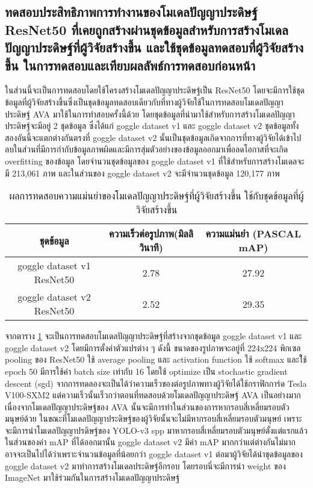 \subsection{ทดสอบประสิทธิภาพการทำงานของโมเดลปัญญาประดิษฐ์ ResNet50 ที่เคยถูกสร้างผ่านชุดข้อมูลสำหรับการสร้างโมเดลปัญญาประดิษฐ์ที่ผู้วิจัยสร้างขึ้น และใช้ชุดข้อมูลทดสอบที่ผู้วิจัยสร้างขึ้น ในการทดสอบและเทียบผลลัพธ์การทดสอบก่อนหน้า}
ในส่วนนี้จะเป็นการทดสอบโดยใช้โครงสร้างโมเดลปัญญาประดิษฐ์เป็น ResNet50 โดยจะมีการใช้ชุดข้อมูลที่ผู้วิจัยสร้างขึ้นซึ่งเป็นชุดข้อมูลทดสอบเดียวกับที่ทางผู้วิจัยใช้ในการทดสอบโมเดลปัญญาประดิษฐ์ AVA มาใช้ในการทำสอบครั้งนี้ด้วย โดยชุดข้อมูลที่นำมาใช้สำหรับการสร้างโมเดลปัญญาประดิษฐ์จะมีอยู่ 2 ชุดข้อมูล ซึ่งได้แก่ goggle dataset v1 และ goggle dataset v2 ชุดข้อมูลทั้งสองอันนี้จะแตกต่างกันตรงที่ goggle dataset v2 นั้นเป็นชุดข้อมูลเกิดจากการที่ทางผู้วิจัยได้เข้าไปลบในส่วนที่มีการกำกับข้อมูลภาพผิดและมีการสุ่มตัวอย่างของข้อมูลออกมาเพื่อลดโอกาสที่จะเกิด overfitting ของข้อมูล โดยจำนวนชุดข้อมูลของ goggle dataset v1 ที่ใช้สำหรับการสร้างโมเดลจะมี 213,061 ภาพ และในส่วนของ goggle dataset v2 จะมีจำนวนชุดข้อมูล 120,177 ภาพ
\clearpage
\begin{table}[!ht]
	\centering
	\begin{tabular}{|c|c|c|}
			\hline
			{ชุดข้อมูล}&{ความเร็วต่อรูปภาพ(มิลลิวินาที)}&{ความแม่นยำ (PASCAL mAP)}			\\
			\hline
			goggle dataset v1 ResNet50			& 2.78			& 27.92				\\
			goggle dataset v2 ResNet50			& 2.52			& 29.35				\\
			\hline
	\end{tabular}
\caption{ผลการทดสอบความแม่นยำของโมเดลปัญญาประดิษฐ์ที่ผู้วิจัยสร้างขึ้น ใช้กับชุดข้อมูลที่ผู้วิจัยสร้างขึ้น}
\label{tab: Test PASCAL mAP of dataset created by the researcher}
\end{table}
จากตาราง \ref{tab: Test PASCAL mAP of dataset created by the researcher} จะเป็นการทดสอบโมเดลปัญญาประดิษฐ์ที่สร้างจากชุดข้อมูล goggle dataset v1 และ goggle dataset v2 โดยมีการตั้งค่าตัวแปรต่าง ๆ ดังนี้ ขนาดของรูปภาพจะอยู่ที่ 224x224 พิกเซล pooling ของ ResNet50 ใช้ average pooling และ activation function ใช้ softmax และใ้ช้ epoch 50 มีการใช้ค่า batch size เท่ากับ 16 โดยใช้ optimize เป็น stochastic gradient descent (sgd) จากการทดลองจะเป็นได้ว่าความเร็วของต่อรูปภาพทางผู้วิจัยได้ใช้กราฟิกการ์ด Tesla V100-SXM2 แต่ความเร็วนั้นเร็วกว่าตอนที่ทดสอบด้วยโมเดลปัญญาประดิษฐ์ AVA เป็นอย่างมาก เนื่องจากโมเดลปัญญาประดิษฐ์ของ AVA นั้นจะมีการทำในส่วนของการหากรอบสี่เหลี่ยมรอบตัวมนุษย์ด้วย ในขณะที่โมเดลปัญญาประดิษฐ์ของผู้วิจัยนั้นจะไม่มีหากรอบสี่เหลี่ยมรอบตัวมนุษย์ เพราะจะมีการนำโมเดลปัญญาปรดิษฐ์ของ YOLO-v3 spp มาหากรอบสี่เหลี่ยมรอบตัวมนุษย์ตั้งแต่แรกแล้ว ในส่วนของค่า mAP ที่ได้ออกมานั้น goggle dataset v2 มีค่า mAP มากกว่าแต่ต่างกันไม่มาก อาจจะเป็นไปได้ว่าเพราะจำนวนข้อมูลที่น้อยกว่า goggle dataset v1 ต่อมาผู้วิจัยได้นำชุดข้อมูลของ goggle dataset v2 มาทำการสร้างโมเดลประดิษฐ์อีกรอบ โดยรอบนี่จะมีการนำ weight ของ ImageNet มาใช้ร่วมกันในการสร้างโมเดลปัญญาประดิษฐ์

